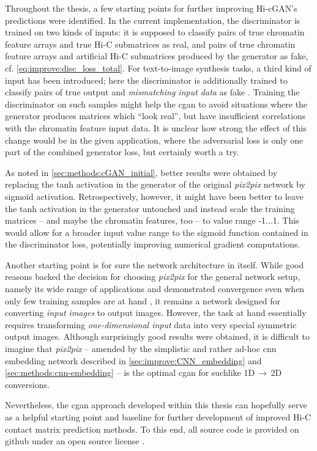 Throughout the thesis, a few starting points for further improving Hi-cGAN's predictions were identified.
In the current implementation, the discriminator is trained on two kinds of inputs:
it is supposed to classify pairs of true chromatin feature arrays and true Hi-C submatrices as real, 
and pairs of true chromatin feature arrays and artificial Hi-C submatrices produced by the generator as fake, cf. \cref{eq:improve:disc_loss_total}.
For text-to-image synthesis tasks, a third kind of input has been introduced; here the discriminator is additionally trained 
to classify pairs of true output and  \emph{mismatching input data} as fake \cite{Reed2016}.
Training the discriminator on such samples might help the \acrshort{cgan} to avoid situations 
where the generator produces matrices which ``look real'', 
but have insufficient correlations with the chromatin feature input data.
It is unclear how strong the effect of this change would be in the given application, 
where the adversarial loss is only one part of the combined generator loss, but certainly worth a try.

As noted in \cref{sec:methods:cGAN_initial}, better results were obtained by replacing the tanh activation in the generator 
of the original \emph{pix2pix} network by sigmoid activation.
Retrospectively, however, it might have been better to leave the tanh activation in the generator untouched
and instead scale the training matrices -- and maybe the chromatin features, too -- to value range -1...1.
This would allow for a broader input value range to the sigmoid function contained in the discriminator loss,
potentially improving numerical gradient computations.

Another starting point is for sure the network architecture in itself.
While good reasons backed the decision for choosing \emph{pix2pix} for the general network setup,
namely its wide range of applications and demonstrated convergence even when only few training samples are at hand \cite{Isola2017},
it remains a network designed for converting \emph{input images} to output images.
However, the task at hand essentially requires transforming \emph{one-dimensional input} data into very special symmetric output images.
Although surprisingly good results were obtained, it is difficult to imagine that \emph{pix2pix} -- amended by the simplistic and rather ad-hoc \acrshort{cnn} embedding network 
described in \cref{sec:improve:CNN_embedding} and \ref{sec:methods:cnn-embedding} -- is the optimal \acrshort{cgan} for suchlike 1D\,$\rightarrow$\,2D conversions.

Nevertheless, the \acrshort{cgan} approach developed within this thesis can hopefully serve as a helpful starting point and baseline
for further development of improved Hi-C contact matrix prediction methods.
To this end, all source code is provided on github under an open source license \cite{Krauth2021a, Krauth2021b}.
\clearpage
